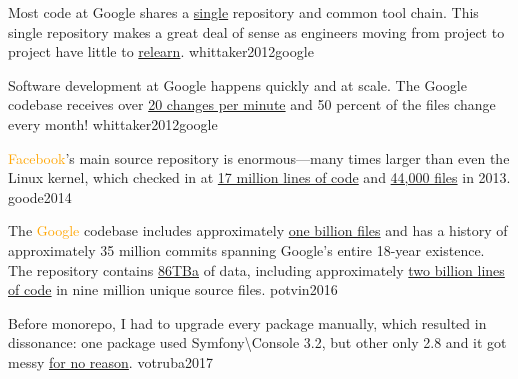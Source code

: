 \documentclass{article}
\begin{document}

  {Most code at Google shares a \ul{single} repository and common tool chain. This single repository makes a great deal of sense as engineers moving from project to project have little to \ul{relearn}.}
  {whittaker2012google}

  {Software development at Google happens quickly and at scale. The Google codebase receives over \ul{20 changes per minute} and 50 percent of the files change every month!}
  {whittaker2012google}

  {\textcolor{orange}{Facebook}'s main source repository is enormous---many times larger than even the Linux kernel, which checked in at \ul{17 million lines of code} and \ul{44,000 files} in 2013.}
  {goode2014}

  {The \textcolor{orange}{Google} codebase includes approximately \ul{one billion files} and has a history of approximately 35 million commits spanning Google's entire 18-year existence. The repository contains \ul{86TBa} of data, including approximately \ul{two billion lines of code} in nine million unique source files.}
  {potvin2016}

  {Before monorepo, I had to upgrade every package manually, which resulted in dissonance: one package used Symfony\textbackslash{}Console 3.2, but other only 2.8 and it got messy \ul{for no reason}.}
  {votruba2017}
\end{document}

